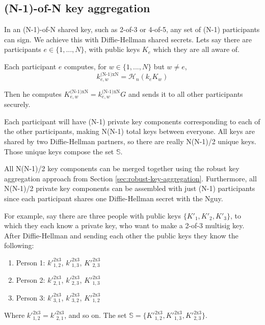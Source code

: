 \subsection{(N-1)-of-N key aggregation}
\label{sec:n-1-of-n}

In an (N-1)-of-N shared key, such as 2-of-3 or 4-of-5, any set of (N-1) participants can sign. We achieve this with Diffie-Hellman shared secrets. Lets say there are participants $e \in \{1,...,N\}$, with public keys $K_e$ which they are all aware of.

Each participant $e$ computes, for $w \in \{1,...,N\}$ but $w \neq e$,
\[ k^{\textrm{(N-1)xN}}_{e,w} = \mathcal{H}_n(k_e K_w) \]

Then he computes $K^{\textrm{(N-1)xN}}_{e,w} = k^{\textrm{(N-1)xN}}_{e,w} G$ and sends it to all other participants securely.

Each participant will have (N-1) private key components corresponding to each of the other participants, making N(N-1) total keys between everyone. All keys are shared by two Diffie-Hellman partners, so there are really N(N-1)/2 unique keys. Those unique keys compose the set $\mathbb{S}$.

All N(N-1)/2 key components can be merged together using the robust key aggregation approach from Section \ref{sec:robust-key-aggregation}. Furthermore, all N(N-1)/2 private key components can be assembled with just (N-1) participants since each participant shares one Diffie-Hellman secret with the N\nth guy.

For example, say there are three people with public keys $\{K'_1,K'_2,K'_3\}$, to which they each know a private key, who want to make a 2-of-3 multisig key. After Diffie-Hellman and sending each other the public keys they know the following:
\begin{enumerate}
    \item Person 1: $k'^{\textrm{2x3}}_{1,2}$, $k'^{\textrm{2x3}}_{1,3}$, $K'^{\textrm{2x3}}_{2,3}$
    \item Person 2: $k'^{\textrm{2x3}}_{2,1}$, $k'^{\textrm{2x3}}_{2,3}$, $K'^{\textrm{2x3}}_{1,3}$
    \item Person 3: $k'^{\textrm{2x3}}_{3,1}$, $k'^{\textrm{2x3}}_{3,2}$, $K'^{\textrm{2x3}}_{1,2}$
\end{enumerate}

Where $k'^{\textrm{2x3}}_{1,2} = k'^{\textrm{2x3}}_{2,1}$, and so on. The set $\mathbb{S} = \{ K'^{\textrm{2x3}}_{1,2}, K'^{\textrm{2x3}}_{1,3}, K'^{\textrm{2x3}}_{2,3}\}$.

